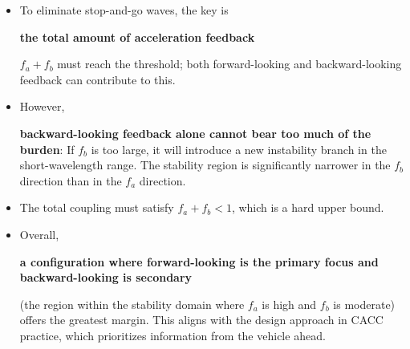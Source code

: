 \documentclass[11pt,a4paper,openany]{book}
\numberwithin{equation}{chapter}
\numberwithin{figure}{chapter}
\numberwithin{table}{chapter}
\begin{document}
\begin{tcolorbox}[notebox,title=\textbf{Engineering Conclusions}]
\begin{itemize}[leftmargin=1.2em,itemsep=3pt]
\item




To eliminate stop-and-go waves, the key is




\textbf{the total amount of acceleration feedback}




$f_a+f_b$ must reach the threshold; both forward-looking and backward-looking feedback can contribute to this.







\item




However,




\textbf{backward-looking feedback alone cannot bear too much of the burden}: If $f_b$ is too large, it will introduce a new instability branch in the short-wavelength range. The stability region is significantly narrower in the $f_b$ direction than in the $f_a$ direction.







\item




 The total coupling must satisfy $f_a+f_b<1$, which is a hard upper bound.







\item




 Overall,




\textbf{a configuration where forward-looking is the primary focus and backward-looking is secondary}




(the region within the stability domain where $f_a$ is high and $f_b$ is moderate) offers the greatest margin. This aligns with the design approach in CACC practice, which prioritizes information from the vehicle ahead.







\end{itemize}
\end{tcolorbox}
\end{document}

